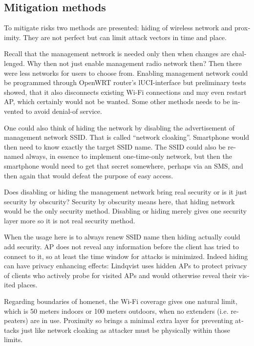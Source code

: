 \documentclass[12pt,a4paper,english]{tutthesis}
\begin{document}
\begin{otherlanguage}{english}
\section{Mitigation methods}
\label{sec-6-9}
To mitigate risks two methods are presented: hiding of
wireless network and proximity. They are not perfect but can
limit attack vectors in time and place.


Recall that the management network is needed only then when changes
are challenged. Why then not just enable management radio network
then? Then there were less networks for users to choose from.
Enabling management network could be programmed through OpenWRT router's 
lUCI-interface but preliminary tests showed, that it also 
disconnects existing Wi-Fi connections and may even restart AP,
which certainly would not be wanted. Some other methods needs to
be invented to avoid denial-of service.

\label{tag:hidessid}
One could also think of hiding the network by disabling the
advertisement of management network SSID. That is called ``network
cloaking''.  Smartphone would then need to know exactly the target SSID name.
The SSID could also be renamed always, in essence
to implement one-time-only network, but then the smartphone would
need to get that secret somewhere, perhaps via an SMS, and then again
that would defeat the purpose of easy access.

Does disabling or hiding the management network bring real security or
is it just security by obscurity?  Security by obscurity means here,
that hiding network would be the only security method.
Disabling or hiding  merely gives one security layer more so it is not
real security method.

When the usage here is to always renew SSID name then
hiding actually could add security. AP does not reveal any information
before the client has tried to connect to it, so at least 
the time window for attacks is minimized. Indeed hiding can have
privacy enhancing effects: Lindqvist\cite{hidden-wlan} uses hidden APs
to protect privacy of clients who actively probe for visited APs and
would otherwise reveal their visited places.


Regarding boundaries of homenet, the Wi-Fi coverage gives 
one natural limit, which is 50 meters indoors or 100 meters outdoors,
when no extenders (i.e. repeaters) are in use.
Proximity so brings a minimal extra layer for preventing attacks
just like network cloaking as attacker must be physically within those limits.



\end{otherlanguage}
\end{document}
